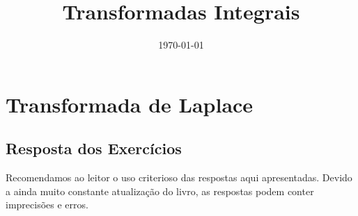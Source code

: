 \documentclass[12pt]{book}
\begin{document}
\frontmatter
\title{Transformadas Integrais}
\date{\today}
\author{}
\maketitle










\tableofcontents


\mainmatter


\part{Transformada de Laplace}









\appendix



\chapter*{Resposta dos Exercícios}
Recomendamos ao leitor o uso criterioso das respostas aqui apresentadas. Devido a ainda muito constante atualização do livro, as respostas podem conter imprecisões e erros.
\shipoutAnswer  





\end{document}
